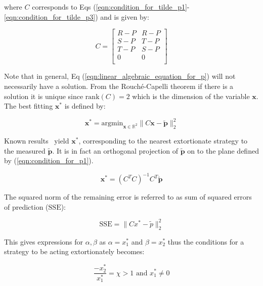 \documentclass[10pt,letterpaper]{article}
\newcommand{\SSe}{\text{SSE}}
\begin{document}
where \(C\) corresponds to Eqs
(\ref{eqn:condition_for_tilde_p1}-\ref{eqn:condition_for_tilde_p3}) and is
given by:

\begin{equation}\label{eqn:definition_of_C}
    C =
    \begin{bmatrix}
        R - P & R- P \\
        S - P & T- P \\
        T - P & S- P \\
        0     & 0 \\
    \end{bmatrix}
\end{equation}

Note that in general, Eq (\ref{eqn:linear_algebraic_equation_for_p}) will
not necessarily have a solution. From the Rouch\'{e}-Capelli theorem if there is
a solution it is unique since \(\text{rank}(C)=2\) which is the dimension of the
variable \(\textbf{x}\). The best fitting \(\textbf{x}^*\) is defined by:

\begin{equation}\label{eqn:x_star}
    \textbf{x}^* = \text{argmin}_{\textbf{x}\in\mathbb{R}^2}\|C \textbf{x}- \tilde{\textbf{p}}\|_2^2
\end{equation}

Known results~\cite{kutner2004applied, rao1973linear, wakefield2013bayesian}
yield \(\textbf{x}^*\), corresponding to the nearest extortionate strategy to the measured
\(\tilde{\textbf{p}}\). It is in fact an orthogonal projection of
\(\tilde{\textbf{p}}\) on to the
plane defined by (\ref{eqn:condition_for_p1}).

\begin{equation}\label{eqn:x_star_formula}
    \textbf{x}^* = {\left(C^{T}C\right)}^{-1}C^{T}\tilde{\textbf{p}}
\end{equation}

The squared norm of the remaining error is referred to as sum of squared errors
of prediction (\(\SSe\)):

\begin{equation}\label{eqn:r_squared}
    \SSe = \|C x^*- \tilde p\|_2^2
\end{equation}

This gives expressions for \(\alpha, \beta\) as \(\alpha=x^*_1\) and
\(\beta=x^*_2\) thus the conditions for a strategy to be acting extortionately
becomes:

\begin{equation}
    \frac{-x^*_2}{x^*_1} = \chi > 1 \text{ and }x^*_1\ne0
        \label{eqn:measured_condition_for_chi}
\end{equation}
\end{document}
